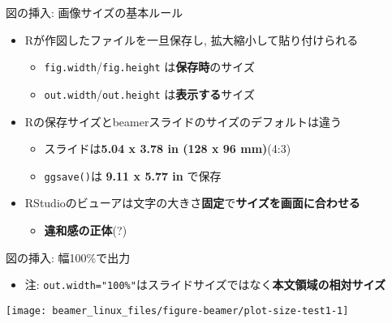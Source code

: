 \documentclass[
  12pt,
  ignorenonframetext,
]{beamer}
\providecommand{\tightlist}{%
  \setlength{\itemsep}{0pt}\setlength{\parskip}{0pt}}
\begin{document}
\begin{frame}[fragile]{図の挿入: 画像サイズの基本ルール}
\protect\hypertarget{ux56f3ux306eux633fux5165-ux753bux50cfux30b5ux30a4ux30baux306eux57faux672cux30ebux30fcux30eb}{}

\begin{itemize}
\tightlist
\item
  Rが作図したファイルを一旦保存し, 拡大縮小して貼り付けられる

  \begin{itemize}
  \tightlist
  \item
    \texttt{fig.width}/\texttt{fig.height} は\textbf{保存時}のサイズ
  \item
    \texttt{out.width}/\texttt{out.height} は\textbf{表示する}サイズ
  \end{itemize}
\item
  Rの保存サイズとbeamerスライドのサイズのデフォルトは違う

  \begin{itemize}
  \tightlist
  \item
    スライドは\textbf{5.04 x 3.78 in (128 x 96 mm)}(4:3)
  \item
    \texttt{ggsave()}は \textbf{9.11 x 5.77 in} で保存
  \end{itemize}
\item
  RStudioのビューアは文字の大きさ\textbf{固定}で\textbf{サイズを画面に合わせる}

  \begin{itemize}
  \tightlist
  \item
    \textbf{違和感の正体}(?)
  \end{itemize}
\end{itemize}

\end{frame}

\begin{frame}[fragile]{図の挿入: 幅100\%で出力}
\protect\hypertarget{ux56f3ux306eux633fux5165-ux5e45100ux3067ux51faux529b}{}

\begin{itemize}
\tightlist
\item
  注:
  \texttt{out.width="100\%"}はスライドサイズではなく\textbf{本文領域の相対サイズ}
\end{itemize}

\begin{center}\texttt{[image: beamer\_linux\_files/figure-beamer/plot-size-test1-1]} \end{center}

\end{frame}
\end{document}
